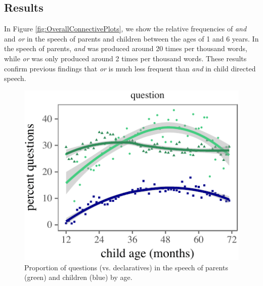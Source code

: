 \documentclass[10pt, letterpaper]{article}
\newenvironment{CodeChunk}{}{}
\begin{document}
\subsection{Results}\label{results}

In Figure \ref{fig:OverallConnectivePlots}, we show the relative
frequencies of \emph{and} and \emph{or} in the speech of parents and
children between the ages of 1 and 6 years. In the speech of parents,
\emph{and} was produced around 20 times per thousand words, while
\emph{or} was only produced around 2 times per thousand words. These
results confirm previous findings that \emph{or} is much less frequent
than \emph{and} in child directed speech.

\begin{CodeChunk}
\begin{figure}[tb]
\includegraphics{figs/utteranceTypeByAgePlot-1} \caption[Proportion of questions (vs]{Proportion of questions (vs. declaratives) in the speech of parents (green) and children (blue) by age.}\label{fig:utteranceTypeByAgePlot}
\end{figure}
\end{CodeChunk}
\end{document}
